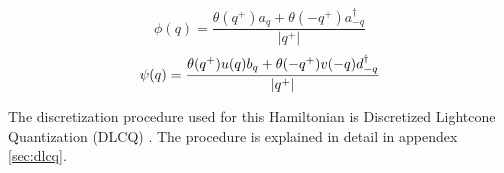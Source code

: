 \begin{equation}
    \label{eq:phi}
    \phi(q) = \frac{\theta(q^+)a_q + \theta(-q^+)a_{-q}^\dagger}{|q^+|}
\end{equation}
\begin{equation}
    \label{eq:psi}
    \psi(q) = \frac{\theta(q^+)u(q)b_q + \theta(-q^+)v(-q)d_{-q}^\dagger}{|q^+|}\\
\end{equation}


The discretization procedure used for this Hamiltonian is Discretized Lightcone Quantization (DLCQ) \cite{}. 
The procedure is explained in detail in appendex \ref{sec:dlcq}.